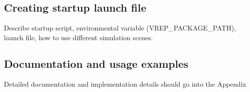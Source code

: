 \subsection{Creating startup launch file}

Describe startup script, environmental variable (VREP\_PACKAGE\_PATH), launch file, how to use different simulation scenes.

\subsection{Documentation and usage examples}
Detailed documentation and implementation details should go into the Appendix


